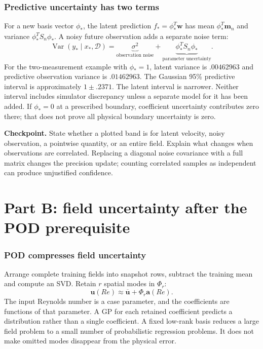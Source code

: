 \documentclass[11pt]{article}
\begin{document}
\section{Predictive uncertainty has two terms}
For a new basis vector $\phi_*$, the latent prediction $f_* =\phi_*^T\mathbf w$
has mean $\phi_*^T\mathbf m_n$ and variance $\phi_*^TS_n\phi_*$. A noisy
future observation adds a separate noise term:
\[
\operatorname{Var}(y_*\mid x_*,\mathcal D)
=\underbrace{\sigma^2}_{\text{observation noise}}
+\underbrace{\phi_*^TS_n\phi_*}_{\text{parameter uncertainty}}.
\]
For the two-measurement example with $\phi_*=1$, latent variance is
$.00462963$ and predictive observation variance is $.01462963$. The Gaussian
95\% predictive interval is approximately $1\pm .2371$. The latent interval is
narrower. Neither interval includes simulator discrepancy unless a separate
model for it has been added. If $\phi_*=0$ at a prescribed boundary, coefficient
uncertainty contributes zero there; that does not prove all physical boundary
uncertainty is zero.

\textbf{Checkpoint.} State whether a plotted band is for latent velocity,
noisy observation, a pointwise quantity, or an entire field. Explain what changes
when observations are correlated. Replacing a diagonal noise covariance with
a full matrix changes the precision update; counting correlated samples as
independent can produce unjustified confidence.

\newpage
\part*{Part B: field uncertainty after the POD prerequisite}
\section{POD compresses field uncertainty}
Arrange complete training fields into snapshot rows, subtract the training mean
and compute an SVD. Retain $r$ spatial modes in $\Phi_r$:
\[
\mathbf u(Re)\approx\overline{\mathbf u}+\Phi_r\mathbf a(Re).
\]
The input Reynolds number is a case parameter, and the coefficients are functions
of that parameter. A GP for each retained coefficient predicts a distribution
rather than a single coefficient. A fixed low-rank basis reduces a large field
problem to a small number of probabilistic regression problems. It does not
make omitted modes disappear from the physical error.
\end{document}
